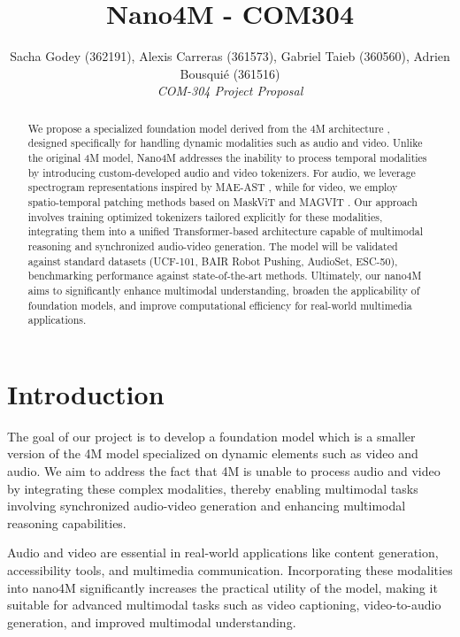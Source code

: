 \documentclass[10pt,conference,compsocconf]{IEEEtran}
\begin{document}
\title{Nano4M - COM304}

\author{
  Sacha Godey (362191), Alexis Carreras (361573), Gabriel Taieb (360560), Adrien Bousquié (361516)\\
  \textit{COM-304 Project Proposal}
}

\maketitle

\begin{abstract}
    We propose a specialized foundation model derived from the 4M architecture \cite{mizrahi_4m_2023}, designed specifically for handling dynamic modalities such as audio and video. Unlike the original 4M model, Nano4M addresses the inability to process temporal modalities by introducing custom-developed audio and video tokenizers. For audio, we leverage spectrogram representations inspired by MAE-AST \cite{baade_mae-ast_2022}, while for video, we employ spatio-temporal patching methods based on MaskViT \cite{gupta_maskvit_2022} and MAGVIT \cite{yu_magvit_2023}. Our approach involves training optimized tokenizers tailored explicitly for these modalities, integrating them into a unified Transformer-based architecture capable of multimodal reasoning and synchronized audio-video generation. The model will be validated against standard datasets (UCF-101, BAIR Robot Pushing, AudioSet, ESC-50), benchmarking performance against state-of-the-art methods. Ultimately, our nano4M aims to significantly enhance multimodal understanding, broaden the applicability of foundation models, and improve computational efficiency for real-world multimedia applications.
\end{abstract}


\section{Introduction}

 The goal of our project is to develop a foundation model which is a smaller version of the 4M model \cite{mizrahi_4m_2023} specialized on dynamic elements such as video and audio. We aim to address the fact that 4M is unable to process audio and video by integrating these complex modalities, thereby enabling multimodal tasks involving synchronized audio-video generation and enhancing multimodal reasoning capabilities.

Audio and video are essential in real-world applications like content generation, accessibility tools, and multimedia communication. Incorporating these modalities into nano4M significantly increases the practical utility  of the model, making it suitable for advanced multimodal tasks such as video captioning, video-to-audio generation, and improved multimodal understanding.
\end{document}
